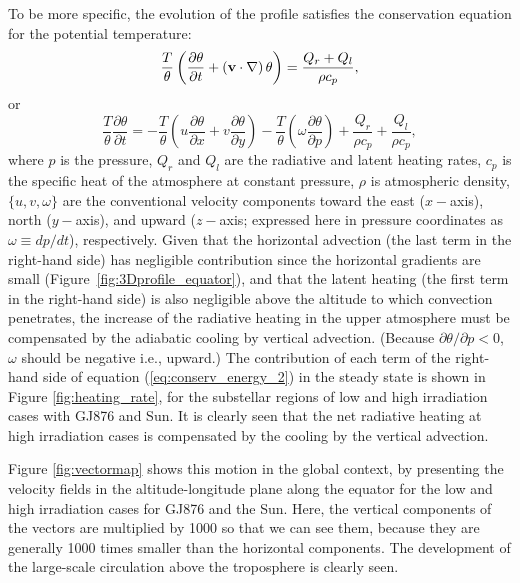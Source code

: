 \documentclass[11pt,numberedappendix,twocolappendix,]{emulateapj}
\begin{document}
To be more specific, the evolution of the profile satisfies the conservation equation for the potential temperature:  
\begin{equation}
\frac{T}{\theta } \left( \frac{\partial \theta }{\partial t} + ( {\bf v} \cdot \nabla ) \, \theta \right) = \frac{ Q_r + Q_l }{\rho c_p} ,   \label{eq:conserv_energy}
\end{equation}
or
\begin{equation}
\frac{T}{\theta } \frac{\partial \theta }{\partial t} = - \frac{T}{\theta }\left( u \frac{\partial \theta }{\partial x} + v\frac{\partial \theta }{\partial y} \right) -\frac{T}{\theta } \left(  \omega \frac{\partial \theta }{\partial p} \right)  + \frac{ Q_r }{\rho c_p} + \frac{ Q_l }{\rho c_p}, \label{eq:conserv_energy_2}
\end{equation}
where $p$ is the pressure, $Q_r$ and $Q_l$ are the radiative and latent heating rates, $c_p$ is the specific heat of the atmosphere at constant pressure, $\rho $ is atmospheric density, $\{ u, v, \omega \}$ are the conventional velocity components toward the east ($x-$axis), north ($y-$axis), and upward ($z-$axis; expressed here in pressure coordinates as $\omega \equiv dp/dt$), respectively. 
%
Given that the horizontal advection (the last term in the right-hand side) has negligible contribution since the horizontal gradients are small (Figure~\ref{fig:3Dprofile_equator}), and that the latent heating (the first term in the right-hand side) is also negligible above the altitude to which convection penetrates, the increase of the radiative heating in the upper atmosphere must be compensated by the adiabatic cooling by vertical advection. 
(Because $\partial \theta / \partial p < 0 $, $\omega $ should be negative i.e., upward.) 
The contribution of each term of the right-hand side of equation (\ref{eq:conserv_energy_2}) in the steady state is shown in Figure \ref{fig:heating_rate}, for the substellar regions of low and high irradiation cases with GJ876 and Sun. %
It is clearly seen that the net radiative heating at high irradiation cases is compensated by the cooling by the vertical advection. 

Figure \ref{fig:vectormap} shows this motion in the global context, by presenting the velocity fields in the altitude-longitude plane along the equator for the low and high irradiation cases for GJ876 and the Sun. 
Here, the vertical components of the vectors are multiplied by 1000 so that we can see them, because they are generally 1000 times smaller than the horizontal components. 
The development of the large-scale circulation above the troposphere is clearly seen. 
\end{document}
